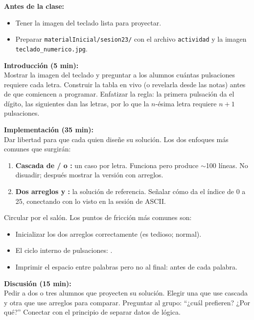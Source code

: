\documentclass[12pt, oneside]{article}
\begin{document}
\begin{notaprofesor}

  \textbf{Antes de la clase:}
  \begin{itemize}
    \item Tener la imagen del teclado lista para proyectar.
    \item Preparar \texttt{materialInicial/sesion23/} con el archivo
          \texttt{actividad} y la imagen \texttt{teclado\_numerico.jpg}.
  \end{itemize}

  \textbf{Introducción (5 min):}\\
  Mostrar la imagen del teclado y preguntar a los alumnos cuántas
  pulsaciones requiere cada letra.  Construir la tabla en vivo
  (o revelarla desde las notas) antes de que comiencen a programar.
  Enfatizar la regla: la primera pulsación da el dígito, las siguientes
  dan las letras, por lo que la $n$-ésima letra requiere $n+1$
  pulsaciones.

  \textbf{Implementación (35 min):}\\
  Dar libertad para que cada quien diseñe su solución.  Los dos
  enfoques más comunes que surgirán:
  \begin{enumerate}
    \item \textbf{Cascada de / o :} un
          caso por letra.  Funciona pero produce $\sim$100 líneas.
          No disuadir; después mostrar la versión con arreglos.
    \item \textbf{Dos arreglos  y :}
          la solución de referencia.  Señalar cómo 
          da el índice de 0 a 25, conectando con lo visto en la
          sesión de ASCII.
  \end{enumerate}
  Circular por el salón.  Los puntos de fricción más comunes son:
  \begin{itemize}
    \item Inicializar los dos arreglos correctamente (es tedioso; normal).
    \item El ciclo interno de pulsaciones: .
    \item Imprimir el espacio entre palabras pero no al final:
           antes de cada palabra.
  \end{itemize}

  \textbf{Discusión (15 min):}\\
  Pedir a dos o tres alumnos que proyecten su solución.  Elegir una
  que use cascada y otra que use arreglos para comparar.  Preguntar
  al grupo: ``¿cuál prefieren?  ¿Por qué?''  Conectar con el principio
  de separar datos de lógica.

\end{notaprofesor}
\end{document}
